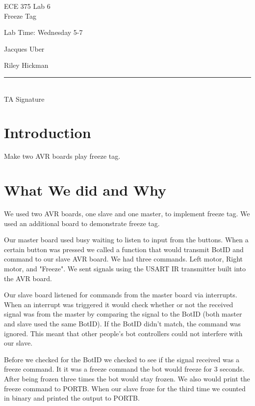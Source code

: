 \documentclass[12pt,letterpaper]{article}
\begin{document}
\begin{titlepage}
    \vspace*{4cm}
    \begin{flushright}
    {\huge
        ECE 375 Lab 6\\[1cm]
    }
    {\large
        Freeze Tag
    }
    \end{flushright}
    \begin{flushleft}
    Lab Time: Wednesday 5-7
    \end{flushleft}
    \begin{flushright}
    Jacques Uber

    Riley Hickman

    \vfill
    \rule{5in}{.5mm}\\
    TA Signature
    \end{flushright}

\end{titlepage}
\section{Introduction}
Make two AVR boards play freeze tag.

\section{What We did and Why}
We used two AVR boards, one slave and one master, to implement freeze tag. We used an additional board to demonstrate freeze tag.

Our master board used busy waiting to listen to input from the buttons. When a certain button was pressed we called a function that would transmit BotID and command to our slave AVR board. We had three commands. Left motor, Right motor, and "Freeze". We sent signals using the USART IR transmitter built into the AVR board.

Our slave board listened for commands from the master board via interrupts. When an interrupt was triggered it would check whether or not the received signal was from the master by comparing the signal to the BotID (both master and slave used the same BotID). If the BotID didn't match, the command was ignored. This meant that other people's bot controllers could not interfere with our slave.

Before we checked for the BotID we checked to see if the signal received was a freeze command. It it was a freeze command the bot would freeze for 3 seconds. After being frozen three times the bot would stay frozen. We also would print the freeze command to PORTB. When our slave froze for the third time we counted in binary and printed the output to PORTB.
\end{document}
